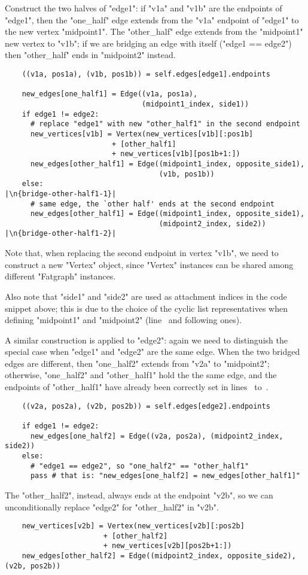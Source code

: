 Construct the two halves of "edge1": if "v1a" and "v1b" are the
endpoints of "edge1", then the "one_half" edge extends from the "v1a"
endpoint of "edge1" to the new vertex "midpoint1".  The "other_half"
edge extends from the "midpoint1" new vertex to "v1b"; if we are
bridging an edge with itself ("edge1 == edge2") then "other_half"
ends in "midpoint2" instead.
\begin{lstlisting}
    ((v1a, pos1a), (v1b, pos1b)) = self.edges[edge1].endpoints

    new_edges[one_half1] = Edge((v1a, pos1a), 
                                (midpoint1_index, side1))
    if edge1 != edge2:
      # replace "edge1" with new "other_half1" in the second endpoint
      new_vertices[v1b] = Vertex(new_vertices[v1b][:pos1b]
                         + [other_half1]
                         + new_vertices[v1b][pos1b+1:])
      new_edges[other_half1] = Edge((midpoint1_index, opposite_side1), 
                                    (v1b, pos1b))
    else:                                                        |\n{bridge-other-half1-1}|
      # same edge, the `other half' ends at the second endpoint
      new_edges[other_half1] = Edge((midpoint1_index, opposite_side1), 
                                    (midpoint2_index, side2))    |\n{bridge-other-half1-2}|

\end{lstlisting}
Note that, when replacing the second endpoint in vertex "v1b", we need
to construct a new "Vertex" object, since "Vertex" instances can be
shared among different "Fatgraph" instances.

Also note that "side1" and "side2" are used as attachment indices in
the code snippet above; this is due to the choice of the cyclic list
representatives when defining "midpoint1" and "midpoint2"
(line~ and following ones).

A similar construction is applied to "edge2": again we need to distinguish the special case when
"edge1" and "edge2" are the same edge.  When the two bridged edges are
different, then "one_half2" extends from
"v2a" to "midpoint2"; otherwise, "one_half2" and "other_half1" hold
the the same edge, and the endpoints of "other_half1" have already
been correctly set in lines~ to~.
\begin{lstlisting}
    ((v2a, pos2a), (v2b, pos2b)) = self.edges[edge2].endpoints

    if edge1 != edge2:
      new_edges[one_half2] = Edge((v2a, pos2a), (midpoint2_index, side2))
    else:
      # "edge1 == edge2", so "one_half2" == "other_half1"
      pass # that is: "new_edges[one_half2] = new_edges[other_half1]"
\end{lstlisting}
The "other_half2", instead, always ends at the endpoint "v2b", so we
can unconditionally replace "edge2" for "other_half2" in "v2b".
\begin{lstlisting}
    new_vertices[v2b] = Vertex(new_vertices[v2b][:pos2b]
                       + [other_half2]
                       + new_vertices[v2b][pos2b+1:])
    new_edges[other_half2] = Edge((midpoint2_index, opposite_side2), (v2b, pos2b))

\end{lstlisting}

